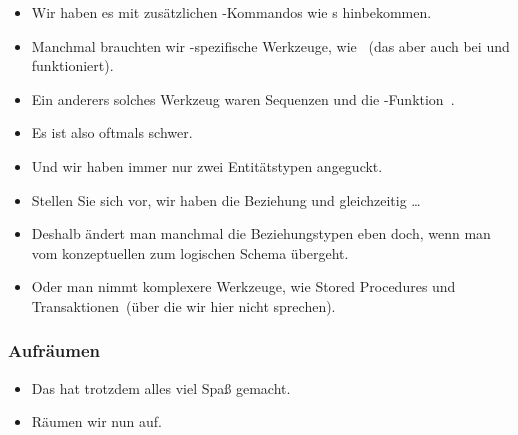\documentclass[aspectratio=169,mathserif,notheorems]{beamer}%
\begin{document}
\begin{frame}
\begin{itemize}
{}%
%
\item<14-> Wir haben es mit zusätzlichen -Kommandos wie s hinbekommen.%
%
\item<15-> Manchmal brauchten wir \postgresql-spezifische Werkzeuge, wie \cite{PGDG:PD:RDFMR}~(das aber auch bei \mariadb\cite{M:MSD:IR} und \sqlite\cite{HWACIS:R} funktioniert).%
%
\item<16-> Ein anderers solches Werkzeug waren Sequenzen und die -Funktion~\cite{PGDG:PD:CS,PGDG:PD:SMF}.%
%
\item<17-> Es ist also oftmals schwer.%
%
\item<18-> Und wir haben immer nur zwei Entitätstypen angeguckt.%
%
\item<19-> Stellen Sie sich vor, wir haben die Beziehung  und gleichzeitig \dots%
%
\item<20-> Deshalb ändert man manchmal die Beziehungstypen eben doch, wenn man vom konzeptuellen zum logischen Schema übergeht.%
%
\item<21-> Oder man nimmt komplexere Werkzeuge, wie Stored Procedures und Transaktionen~(über die wir hier nicht sprechen).%
%
\end{itemize}%
\end{frame}%
%
\begin{frame}[t]%
\frametitle{Aufräumen}%
\begin{itemize}%
\item Das hat trotzdem alles viel Spaß gemacht.%
\item<2-> Räumen wir nun auf.
\end{itemize}%
%
%
%
\end{frame}%

\endPresentation%
\end{document}
